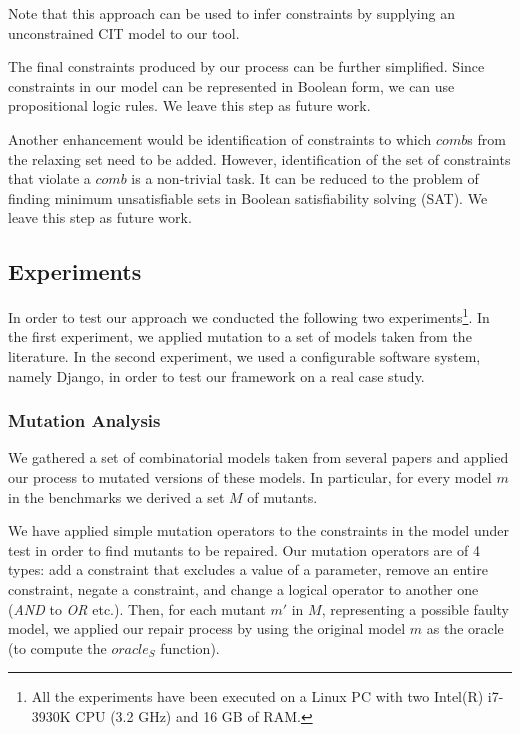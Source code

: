 \begin{tikzborder}{\cite{Gargantini16:validation}}
\begin{tikzborder}{\cite{gargantini_combinatorial_2017}}
Note that this approach can be used to infer constraints by supplying an unconstrained CIT model to our tool. 

The final constraints produced by our process can be further simplified. Since constraints in our model can be represented in Boolean form, we can use propositional logic rules. We leave this step as future work. 

Another enhancement would be identification of constraints to which $comb$s from the relaxing set need to be added. However, identification of the set of constraints that violate a $comb$ is a non-trivial task. It can be reduced to the problem of finding minimum unsatisfiable sets in Boolean satisfiability solving (SAT). We leave this step as future work.\be

\subsection{Experiments}\label{sec:constr_experiments}

\bb In order to test our approach we conducted the following two experiments\footnote{All the experiments have been executed on a Linux PC with two Intel(R) i7-3930K CPU  (3.2 GHz) and 16 GB of RAM.}. In the first experiment, we applied mutation to a set of models taken from the literature. In the second experiment, we used a configurable software system, namely Django, in order to test our framework on a real case study.\be


\subsubsection{Mutation Analysis}

\bb
We gathered a set of combinatorial models taken from several papers and applied our process to mutated versions of these models. In particular, for every model $m$ in the benchmarks we derived a set $M$ of mutants.

We have applied simple mutation operators to the constraints in the model under test in order to find  mutants to be repaired. Our mutation operators are of 4 types: add a constraint that excludes a value of a parameter, remove an entire constraint, negate a constraint, and change a logical operator to another one (\emph{AND} to \emph{OR} etc.).   Then, for each mutant $m'$ in $M$, representing a possible faulty model,  we applied our repair process by using the original model $m$ as the oracle (to compute the $\mathit{oracle}_S$ function). 


\end{tikzborder}
\end{tikzborder}

